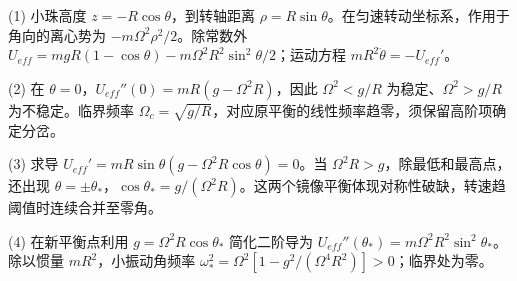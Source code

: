 (1) 小珠高度 $z=-R\cos\theta$，到转轴距离 $\rho=R\sin\theta$。在匀速转动坐标系，作用于角向的离心势为 $-m\Omega^2\rho^2/2$。除常数外 $U_{eff}=mgR(1-\cos\theta)-m\Omega^2R^2\sin^2\theta/2$；运动方程 $mR^2\ddot\theta=-U_{eff}'$。

(2) 在 $\theta=0$，$U_{eff}''(0)=mR(g-\Omega^2R)$，因此 $\Omega^2<g/R$ 为稳定、$\Omega^2>g/R$ 为不稳定。临界频率 $\Omega_c=\sqrt{g/R}$，对应原平衡的线性频率趋零，须保留高阶项确定分岔。

(3) 求导 $U_{eff}'=mR\sin\theta(g-\Omega^2R\cos\theta)=0$。当 $\Omega^2R>g$，除最低和最高点，还出现 $\theta=\pm\theta_*$，$\cos\theta_*=g/(\Omega^2R)$。这两个镜像平衡体现对称性破缺，转速趋阈值时连续合并至零角。

(4) 在新平衡点利用 $g=\Omega^2R\cos\theta_*$ 简化二阶导为 $U_{eff}''(\theta_*)=m\Omega^2R^2\sin^2\theta_*$。除以惯量 $mR^2$，小振动角频率 $\omega_*^2=\Omega^2[1-g^2/(\Omega^4R^2)]>0$；临界处为零。

